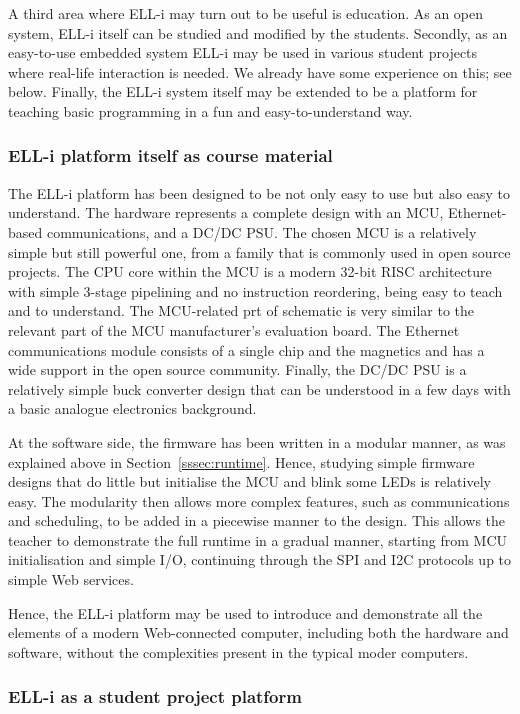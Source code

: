 \documentclass[draft,a4paper]{siamltex}
\begin{document}
A third area where ELL-i may turn out to be useful is education.  As
an open system, ELL-i itself can be studied and modified by the
students.  Secondly, as an easy-to-use embedded system ELL-i may be
used in various student projects where real-life interaction is
needed.  We already have some experience on this; see below.  Finally,
the ELL-i system itself may be extended to be a platform for teaching
basic programming in a fun and easy-to-understand way.

\subsubsection{ELL-i platform itself as course material}

The ELL-i platform has been designed to be not only easy to use but
also easy to understand.  The hardware represents a complete design
with an MCU, Ethernet-based communications, and a DC/DC PSU.  The
chosen MCU is a relatively simple but still powerful one, from a
family that is commonly used in open source projects.  The CPU core
within the MCU is a modern 32-bit RISC architecture with simple
3-stage pipelining and no instruction reordering, being easy to teach
and to understand.  The MCU-related prt of schematic is very similar
to the relevant part of the MCU manufacturer's evaluation board.  The
Ethernet communications module consists of a single chip and the
magnetics and has a wide support in the open source community.
Finally, the DC/DC PSU is a relatively simple buck converter design
that can be understood in a few days with a basic analogue electronics
background.

At the software side, the firmware has been written in a modular
manner, as was explained above in Section~\ref{sssec:runtime}.  Hence,
studying simple firmware designs that do little but initialise the MCU
and blink some LEDs is relatively easy.  The modularity then allows
more complex features, such as communications and scheduling, to be
added in a piecewise manner to the design.  This allows the teacher to
demonstrate the full runtime in a gradual manner, starting from MCU
initialisation and simple I/O, continuing through the SPI and I2C
protocols up to simple Web services.

Hence, the ELL-i platform may be used to introduce and demonstrate all
the elements of a modern Web-connected computer, including both the
hardware and software, without the complexities present in the typical
moder computers.

\subsubsection{ELL-i as a student project platform}
\end{document}
